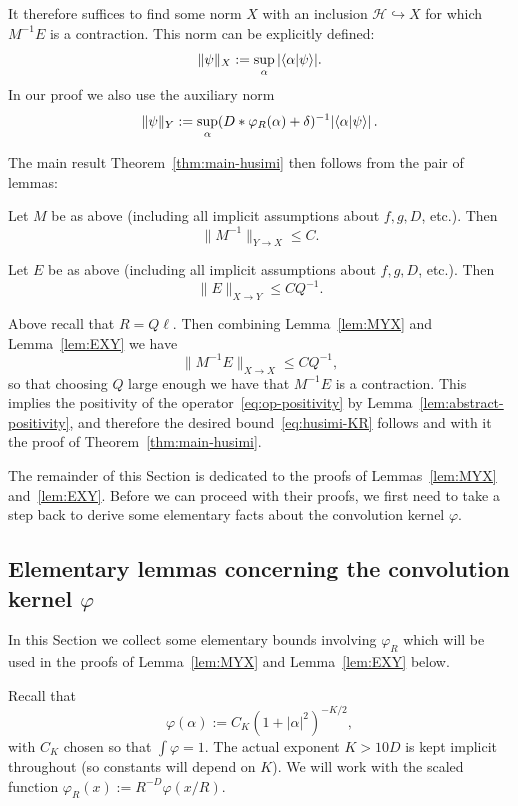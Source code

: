 \documentclass[11pt]{amsart}
\newcommand{\mcal}[1]{{\mathcal{#1}}}
\def\Braket#1{\!\mathinner{\langle{#1}\rangle}\!}
\numberwithin{equation}{section}
\begin{document}
It therefore suffices to find some norm $X$ with an inclusion $\mcal{H}\hookrightarrow X$
for which $M^{-1}E$ is a contraction.  This norm can be explicitly defined:
\[
\|\psi\|_X := \sup_\alpha |\Braket{\alpha|\psi}|.
\]
In our proof we also use the auxiliary norm
\[
\|\psi\|_Y := \sup_\alpha (D\ast \varphi_{R}(\alpha) +\delta)^{-1} |\Braket{\alpha|\psi}|\,.
\]

The main result Theorem~\ref{thm:main-husimi} then follows from the pair of lemmas:
\begin{lemma}
\label{lem:MYX}
Let $M$ be as above (including all implicit assumptions about $f,g,D$, etc.).  Then
\begin{equation}
\label{eq:Minv}
\|M^{-1}\|_{Y\to X} \leq C.
\end{equation}
\end{lemma}

\begin{lemma}
\label{lem:EXY}
Let $E$ be as above (including all implicit assumptions about $f,g,D$, etc.).  Then
\begin{equation}
\label{eq:E}
\|E\|_{X\to Y} \leq CQ^{-1}.
\end{equation}
\end{lemma}
Above recall that $R = Q\ell$.  Then combining Lemma~\ref{lem:MYX} and
Lemma~\ref{lem:EXY} we have
\[
\|M^{-1}E\|_{X\to X} \leq C Q^{-1},
\]
so that choosing $Q$ large enough we have that $M^{-1}E$ is a contraction.  This implies
the positivity of the operator~\eqref{eq:op-positivity} by Lemma~\ref{lem:abstract-positivity}, and therefore the desired bound~\eqref{eq:husimi-KR} follows and with it the proof of Theorem~\ref{thm:main-husimi}.

The remainder of this Section is dedicated to the proofs of Lemmas~\ref{lem:MYX} and~\ref{lem:EXY}.
Before we can proceed with their proofs, we first need to take a step back to derive some
elementary facts about the convolution kernel $\varphi$.

\subsection{Elementary lemmas concerning the convolution kernel $\varphi$}
\label{sec:phibds}

In this Section we collect some elementary bounds involving $\varphi_R$ which will be used in the proofs of
Lemma~\ref{lem:MYX} and Lemma~\ref{lem:EXY} below.

Recall that
\[
\varphi(\alpha) := C_K (1 + |\alpha|^2)^{-K/2},
\]
with $C_K$ chosen so that $\int \varphi = 1$.  The actual exponent $K > 10D$ is kept implicit throughout (so constants will depend on $K$).  We will work with the scaled function $\varphi_R(x) := R^{-D} \varphi(x/R)$.
\end{document}
